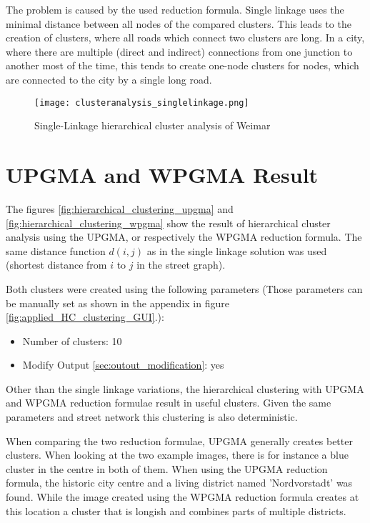 The problem is caused by the used reduction formula. Single linkage uses the minimal distance between all nodes of the compared clusters. This leads to the creation of clusters, where all roads which connect two clusters are long. In a city, where there are multiple (direct and indirect) connections from one junction to another most of the time, this tends to create one-node clusters for nodes, which are connected to the city by a single long road.

\begin{figure}
    \centering
    \begin{mdframed}[style=mdthight]
        \texttt{[image: clusteranalysis\_singlelinkage.png]}
    \end{mdframed}
    \caption{Single-Linkage hierarchical cluster analysis of Weimar\label{fig:SingleLinkage}}
\end{figure}

\pagebreak
\section{UPGMA and WPGMA Result}
\label{sec:UPGMAandWPGMA}
The figures \ref{fig:hierarchical_clustering_upgma} and \ref{fig:hierarchical_clustering_wpgma} show the result of hierarchical cluster analysis using the \acrshort{UPGMA}, or respectively the \acrshort{WPGMA} reduction formula. The same distance function $d(i, j)$ as in the single linkage solution was used (shortest distance from $i$ to $j$ in the street graph).

Both clusters were created using the following parameters (Those parameters can be manually set as shown in the appendix in figure \ref{fig:applied_HC_clustering_GUI}.):

\begin{itemize}
    \item Number of clusters: 10
    \item Modify Output \ref{sec:outout_modification}: yes
\end{itemize}

Other than the single linkage variations, the hierarchical clustering with \acrshort{UPGMA} and \acrshort{WPGMA} reduction formulae result in useful clusters. Given the same parameters and street network this clustering is also deterministic.

When comparing the two reduction formulae, \acrshort{UPGMA} generally creates better clusters. When looking at the two example images, there is for instance a blue cluster in the centre in both of them. When using the \acrshort{UPGMA} reduction formula, the historic city centre and a living district named 'Nordvorstadt' was found. While the image created using the \acrshort{WPGMA} reduction formula creates at this location a cluster that is longish and combines parts of multiple districts.

